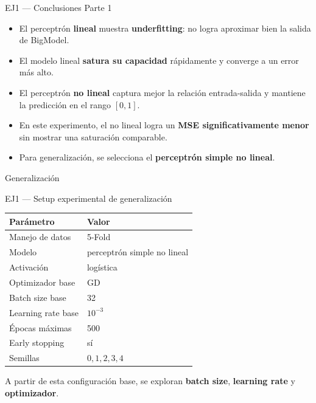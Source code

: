 \documentclass[aspectratio=169,10pt]{beamer}
\begin{document}
\begin{frame}{EJ1 --- Conclusiones Parte 1}
  \small
  \begin{itemize}
    \item El perceptrón \textbf{lineal} muestra \textbf{underfitting}: no logra aproximar bien la salida de BigModel.
    \item El modelo lineal \textbf{satura su capacidad} rápidamente y converge a un error más alto.
    \item El perceptrón \textbf{no lineal} captura mejor la relación entrada-salida y mantiene la predicción en el rango $[0,1]$.
    \item En este experimento, el no lineal logra un \textbf{MSE significativamente menor} sin mostrar una saturación comparable.
    \item Para generalización, se selecciona el \textbf{perceptrón simple no lineal}.
  \end{itemize}
\end{frame}

\begin{frame}[plain]
  \centering
  \vfill
  {\Huge Generalización}
  \vfill
\end{frame}

\begin{frame}{EJ1 --- Setup experimental de generalización}
  \begin{table}
    \centering
    \scriptsize
    \begin{tabular}{ll}
      \toprule
      Parámetro & Valor \\
      \midrule
      Manejo de datos & 5-Fold \\
      Modelo & perceptrón simple no lineal \\
      Activación & logística \\
      Optimizador base & GD \\
      Batch size base & 32 \\
      Learning rate base & $10^{-3}$ \\
      Épocas máximas & 500 \\
      Early stopping & sí \\
      Semillas & $0,1,2,3,4$ \\
      \bottomrule
    \end{tabular}
  \end{table}

  \scriptsize
  A partir de esta configuración base, se exploran \textbf{batch size},
  \textbf{learning rate} y \textbf{optimizador}.
\end{frame}
\end{document}
